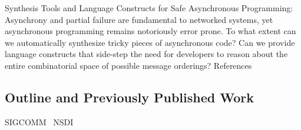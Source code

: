 Synthesis Tools and Language Constructs for Safe Asynchronous Programming: Asynchrony and partial failure are fundamental to networked systems, yet asynchronous programming remains notoriously error prone. To what extent can we automatically synthesize tricky pieces of asynchronous code? Can we provide language constructs that side-step the need for developers to reason about the entire combinatorial space of possible message orderings?
References

\subsection{Outline and Previously Published Work}

SIGCOMM~\cite{sts2014}
NSDI~\cite{Scott:2015:DEMi}
